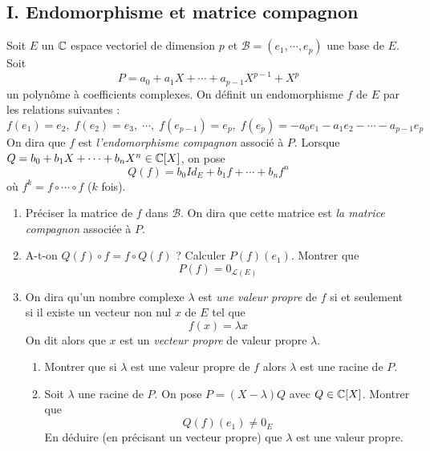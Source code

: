 \subsection*{I. Endomorphisme et matrice compagnon}
Soit $E$ un $\mathbb{C}$ espace vectoriel de dimension $p$ et $\mathcal{B}=(e_1,\cdots,e_p)$ une base de $E$. \newline
Soit 
\begin{displaymath}
P=a_0+a_1X + \cdots +a_{p-1}X^{p-1}+X^p 
\end{displaymath}
un polynôme à coefficients complexes. On définit un endomorphisme $f$ de $E$ par les relations suivantes :
\begin{displaymath}
f(e_1) = e_2,\; f(e_2) = e_3,\; \cdots,\; f(e_{p-1}) = e_p,\;
 f(e_p) = -a_0 e_1 -a_1e_2 - \cdots - a_{p-1}e_p
\end{displaymath}
On dira que $f$ est \emph{l'endomorphisme compagnon} associé à $P$.\newline
Lorsque $Q=b_0+b_1X+\cdots+b_{n}X^n\in\mathbb{C}[X]$, on pose
\[Q(f)=b_0Id_E+b_1f+\cdots +b_nf^n\]
où $f^k = f\circ\cdots\circ f$ ($k$ fois).
\begin{enumerate}
\item Préciser la matrice de $f$ dans $\mathcal{B}$. On dira que cette matrice est \emph{la matrice compagnon} associée à $P$.
\item A-t-on $Q(f)\circ f= f\circ Q(f)$ ? Calculer $P(f)(e_1)$. Montrer que
\[P(f) = 0_{\mathcal{L}(E)}\]
\item On dira qu'un nombre complexe $\lambda$ est \emph{une valeur propre} de $f$ si et seulement si il existe un vecteur non nul $x$ de $E$ tel que 
\[f(x)=\lambda x\]
On dit alors que $x$ est un \emph{vecteur propre} de valeur propre $\lambda$.
\begin{enumerate}
\item Montrer que si $\lambda$ est une valeur propre de $f$ alors $\lambda$ est une racine de $P$.
\item Soit $\lambda$ une racine de $P$. On pose $P=(X-\lambda)Q$ avec $Q\in\mathbb{C}[X]$. Montrer que
\[Q(f)(e_1)\neq 0_E\]
En déduire (en précisant un vecteur propre) que $\lambda$ est une valeur propre.
\end{enumerate}  
\end{enumerate} 

